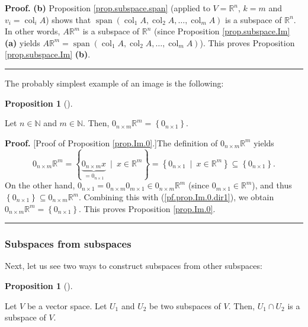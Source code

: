 \documentclass[numbers=enddot,12pt,final,onecolumn,notitlepage]{scrartcl}%
\theoremstyle{definition}
\newtheorem{prop}[theo]{Proposition}
\newenvironment{proposition}[1][]
{\begin{prop}[#1]\begin{leftbar}}
{\end{leftbar}\end{prop}}
\newenvironment{proof}[1][Proof]{\noindent\textbf{#1.} }{\ \rule{0.5em}{0.5em}}
\begin{document}
\begin{proof}
\textbf{(b)} Proposition \ref{prop.subspace.span} (applied to $V=\mathbb{R}%
^{n}$, $k=m$ and $v_{i}=\operatorname*{col}\nolimits_{i}A$) shows that
$\operatorname{span}\left(  \operatorname*{col}\nolimits_{1}%
A,\operatorname*{col}\nolimits_{2}A,\ldots,\operatorname*{col}\nolimits_{m}%
A\right)  $ is a subspace of $\mathbb{R}^{n}$. In other words, $A\mathbb{R}%
^{m}$ is a subspace of $\mathbb{R}^{n}$ (since Proposition
\ref{prop.subspace.Im} \textbf{(a)} yields $A\mathbb{R}^{m}%
=\operatorname{span}\left(  \operatorname*{col}\nolimits_{1}%
A,\operatorname*{col}\nolimits_{2}A,\ldots,\operatorname*{col}\nolimits_{m}%
A\right)  $). This proves Proposition \ref{prop.subspace.Im} \textbf{(b)}.
\end{proof}

The probably simplest example of an image is the following:

\begin{proposition}
\label{prop.Im.0}Let $n\in\mathbb{N}$ and $m\in\mathbb{N}$. Then, $0_{n\times
m}\mathbb{R}^{m}=\left\{  0_{n\times1}\right\}  $.
\end{proposition}

\begin{proof}
[Proof of Proposition \ref{prop.Im.0}.]The definition of $0_{n\times
m}\mathbb{R}^{m}$ yields
\begin{equation}
0_{n\times m}\mathbb{R}^{m}=\left\{  \underbrace{0_{n\times m}x}%
_{=0_{n\times1}}\ \mid\ x\in\mathbb{R}^{m}\right\}  =\left\{  0_{n\times
1}\ \mid\ x\in\mathbb{R}^{m}\right\}  \subseteq\left\{  0_{n\times1}\right\}
. \label{pf.prop.Im.0.dir1}%
\end{equation}
On the other hand, $0_{n\times1}=0_{n\times m}0_{m\times1}\in0_{n\times
m}\mathbb{R}^{m}$ (since $0_{m\times1}\in\mathbb{R}^{m}$), and thus $\left\{
0_{n\times1}\right\}  \subseteq0_{n\times m}\mathbb{R}^{m}$. Combining this
with (\ref{pf.prop.Im.0.dir1}), we obtain $0_{n\times m}\mathbb{R}%
^{m}=\left\{  0_{n\times1}\right\}  $. This proves Proposition \ref{prop.Im.0}.
\end{proof}

\subsubsection{Subspaces from subspaces}

Next, let us see two ways to construct subspaces from other subspaces:

\begin{proposition}
\label{prop.subspace.inter}Let $V$ be a vector space. Let $U_{1}$ and $U_{2}$
be two subspaces of $V$. Then, $U_{1}\cap U_{2}$ is a subspace of $V$.
\end{proposition}
\end{document}
